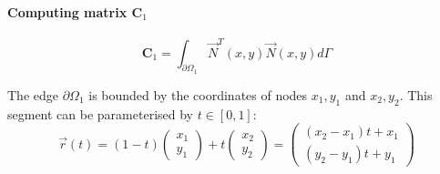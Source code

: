 \newpage
\paragraph{Computing matrix ${\bm C}_1$}
\[
{\bm C}_1
=\int_{\partial\Omega_1} \vec{N}^T(x,y) \vec{N}(x,y) d\Gamma
\]

The edge $\partial\Omega_1$ is bounded by the coordinates of nodes $x_1,y_1$
and $x_2,y_2$. This segment can be parameterised by $t\in[0,1]$:
\[
\vec{r}(t) = (1-t)\left(\begin{array}{c} x_1 \\ y_1 \end{array} \right) + 
t \left(\begin{array}{c} x_2 \\ y_2 \end{array} \right)
=
\left(\begin{array}{c} (x_2-x_1)t +x_1 \\ (y_2-y_1)t+y_1 \end{array} \right) 
\]

